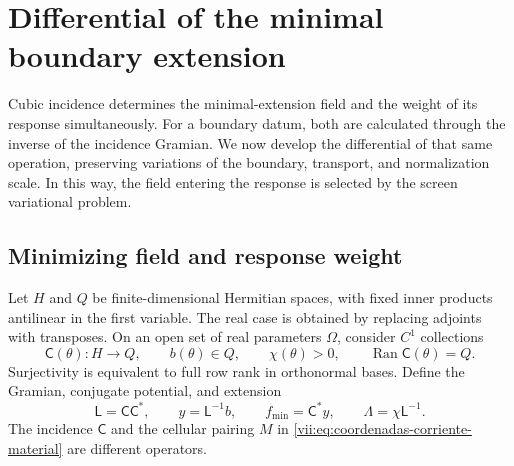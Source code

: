 
\section{Differential of the minimal boundary extension}
\label{vii:sec:corriente-extension-minima}

Cubic incidence determines the minimal-extension field and the weight
of its response simultaneously. For a boundary datum, both are
calculated through the inverse of the incidence Gramian. We now develop
the differential of that same operation, preserving variations
of the boundary, transport, and normalization scale. In this
way, the field entering the response is selected by
the screen variational problem.

\subsection{Minimizing field and response weight}
\label{vii:subsec:extension-minima-parametrizada}

Let \(H\) and \(Q\) be finite-dimensional Hermitian spaces, with
fixed inner products antilinear in the first variable. The real case is
obtained by replacing adjoints with transposes. On an open set of
real parameters \(\Omega\), consider \(C^1\) collections
\[
 \mathsf C(\theta):H\longrightarrow Q,\qquad
 b(\theta)\in Q,\qquad \chi(\theta)>0,
 \qquad \operatorname{Ran}\mathsf C(\theta)=Q.
\]
Surjectivity is equivalent to full row rank in orthonormal bases.
Define the Gramian, conjugate potential, and extension
\begin{equation}
 \mathsf L=\mathsf C\mathsf C^*,\qquad
 y=\mathsf L^{-1}b,\qquad f_{\min}=\mathsf C^*y,
 \qquad \Lambda=\chi\mathsf L^{-1}.
 \label{vii:eq:gramiano-extension-minima}
\end{equation}
The incidence \(\mathsf C\) and the cellular pairing \(M\) in
\eqref{vii:eq:coordenadas-corriente-material} are different operators.

